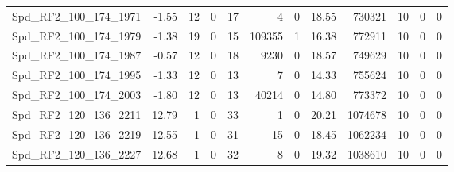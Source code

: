 \begin{longtable}[c]{@{}lrrrrrrrrrrr@{}}
Spd\_RF2\_100\_174\_1971      & -1.55                  & 12                      & 0                       & 17                     & 4                       & 0                       & 18.55                   & 730321                   & 10                       & 0                        & 0                        \\
Spd\_RF2\_100\_174\_1979      & -1.38                  & 19                      & 0                       & 15                     & 109355                  & 1                       & 16.38                   & 772911                   & 10                       & 0                        & 0                        \\
Spd\_RF2\_100\_174\_1987      & -0.57                  & 12                      & 0                       & 18                     & 9230                    & 0                       & 18.57                   & 749629                   & 10                       & 0                        & 0                        \\
Spd\_RF2\_100\_174\_1995      & -1.33                  & 12                      & 0                       & 13                     & 7                       & 0                       & 14.33                   & 755624                   & 10                       & 0                        & 0                        \\
Spd\_RF2\_100\_174\_2003      & -1.80                  & 12                      & 0                       & 13                     & 40214                   & 0                       & 14.80                   & 773372                   & 10                       & 0                        & 0                        \\
Spd\_RF2\_120\_136\_2211      & 12.79                  & 1                       & 0                       & 33                     & 1                       & 0                       & 20.21                   & 1074678                  & 10                       & 0                        & 0                        \\
Spd\_RF2\_120\_136\_2219      & 12.55                  & 1                       & 0                       & 31                     & 15                      & 0                       & 18.45                   & 1062234                  & 10                       & 0                        & 0                        \\
Spd\_RF2\_120\_136\_2227      & 12.68                  & 1                       & 0                       & 32                     & 8                       & 0                       & 19.32                   & 1038610                  & 10                       & 0                        & 0                        \\

\end{longtable}
